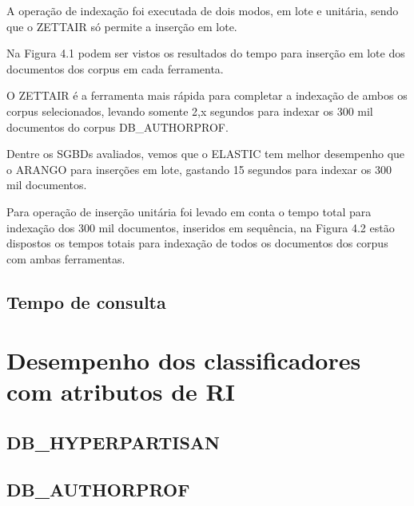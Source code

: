 		A operação de indexação foi executada de dois modos, em lote e unitária, sendo que o ZETTAIR só permite a inserção em lote. 

		

		Na Figura 4.1 podem ser vistos os resultados do tempo para inserção em lote dos documentos dos corpus  em cada ferramenta. 

		

		O ZETTAIR é a ferramenta mais rápida para completar a indexação de ambos os corpus selecionados, levando somente 2,x segundos para indexar os 300 mil documentos do corpus DB_AUTHORPROF. 

		Dentre os SGBDs avaliados, vemos que o ELASTIC tem  melhor desempenho que o ARANGO para inserções em lote, gastando 15 segundos para indexar os 300 mil documentos. 

		

		Para operação de inserção unitária foi levado em conta o tempo total para indexação dos 300 mil documentos, inseridos em sequência, na Figura 4.2 estão dispostos os tempos totais para indexação de todos os documentos dos corpus com ambas ferramentas. 

	\subsection{Tempo de consulta}

\section{Desempenho dos classificadores com atributos de RI} \label{sec:resex1}

	\subsection{DB\_HYPERPARTISAN}

	\subsection{DB\_AUTHORPROF}






